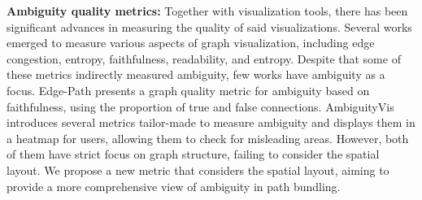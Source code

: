 \textbf{Ambiguity quality metrics:} Together with visualization tools, there has been significant advances in measuring the quality of said visualizations. Several works emerged to measure various aspects of graph visualization, including edge congestion\cite{carpendale:2001}, entropy\cite{tufte:1983}, faithfulness\cite{nguyen:2013,nguyen:2017}, readability\cite{dunne:2009,dunne:2015}, and entropy\cite{sips:2009,tatu:2009}. Despite that some of these metrics indirectly measured ambiguity, few works have ambiguity as a focus. Edge-Path\cite{wallinger:2022} presents a graph quality metric for ambiguity based on faithfulness, using the proportion of true and false connections. AmbiguityVis\cite{wang:2016} introduces several metrics tailor-made to measure ambiguity and displays them in a heatmap for users, allowing them to check for misleading areas. However, both of them have strict focus on graph structure, failing to consider the spatial layout. We propose a new metric that considers the spatial layout, aiming to provide a more comprehensive view of ambiguity in path bundling.
